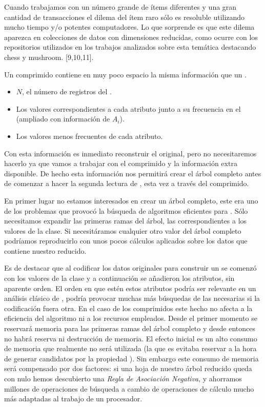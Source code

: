\ABIERTO
Cuando trabajamos con un número grande de ítems diferentes y
una gran cantidad de transacciones el dilema del ítem raro sólo es
resoluble utilizando mucho tiempo y/o potentes computadores. Lo
que sorprende es que este dilema aparezca en colecciones de datos
con dimensiones reducidas, como ocurre con los repositorios
utilizados en los trabajos analizados sobre esta temática
destacando chess y mushroom. [9,10,11].


Un \catalogo comprimido contiene en muy poco espacio la misma información que un \catalogo.
\begin{itemize}
   \item $N$, el número de registros del \catalogo.
   \item Los valores correspondientes a cada atributo junto a su frecuencia en el \catalogo (\aprioriC[1] ampliado con información de $A_i$).
   \item Los valores menos frecuentes de cada atributo.
\end{itemize}

Con esta información es inmediato reconstruir el \catalogo original, pero no necesitaremos hacerlo ya que vamos a trabajar con el \catalogo comprimido y la información extra disponible. De hecho esta información nos permitirá crear el árbol \aprioriL completo antes de comenzar a hacer la segunda lectura de \D, esta vez a través del \catalogo comprimido.

En primer lugar no estamos interesados en crear un árbol \aprioriL completo, este era uno de los problemas que provocó la búsqueda de algoritmos eficientes para \ARM. Sólo necesitamos expandir las primeras ramas del árbol, las correspondientes a los valores de la clase. Si necesitáramos cualquier otro valor del árbol completo podríamos reproducirlo con unos pocos cálculos aplicados sobre los datos que contiene nuestro \aprioriL reducido.

Es de destacar que al codificar los datos originales para construir un \catalogo se comenzó con los valores de la clase y a continuación se añadieron los atributos, sin aparente orden. El orden en que estén estos atributos podría ser relevante en un análisis clásico de \arm, podría provocar muchas más búsquedas de las necesarias si la codificación fuera otra. En el caso de los \catalogos comprimidos este hecho no afecta a la eficiencia del algoritmo ni a los recursos empleados. Desde el primer momento se reservará memoria para las primeras ramas del árbol \aprioriL completo y desde entonces no habrá reserva ni destrucción de memoria. El efecto inicial es un alto consumo de memoria que realmente no será utilizada (la que es evitaba reservar a la hora de generar candidatos por la propiedad \apriori). Sin embargo este consumo de memoria será compensado por dos factores: si una hoja de nuestro árbol \aprioriL reducido queda con \soporte nulo hemos descubierto una \emph{Regla de Asociación Negativa}, y ahorramos millones de operaciones de búsqueda a cambio de operaciones de cálculo mucho más adaptadas al trabajo de un procesador.








